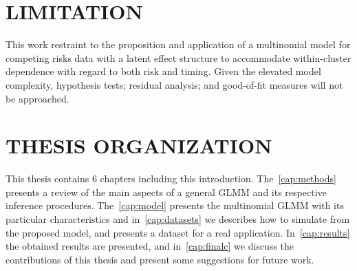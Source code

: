 \section{LIMITATION}

This work restraint to the proposition and application of a multinomial
model for competing risks data with a latent effect structure to
accommodate within-cluster dependence with regard to both risk and
timing. Given the elevated model complexity, hypothesis tests; residual
analysis; and good-of-fit measures will not be approached.

\section{THESIS ORGANIZATION}

This thesis contains 6 chapters including this introduction.
The~\autoref{cap:methods} presents a review of the main aspects of a
general GLMM and its respective inference procedures.
The~\autoref{cap:model} presents the multinomial GLMM with its
particular characteristics and in~\autoref{cap:datasets} we describes
how to simulate from the proposed model, and presents a dataset for a
real application. In~\autoref{cap:results} the obtained results are
presented, and in~\autoref{cap:finalc} we discuss the contributions of
this thesis and present some suggestions for future work.

